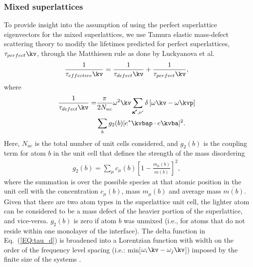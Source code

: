 \subsubsection{Mixed superlattices}
To provide insight into the assumption of using the perfect superlattice eigenvectors for the mixed superlattices, we use Tamura elastic mass-defect scattering theory \cite{tamura_isotope_1983} to modify the lifetimes predicted for perfect superlattices, $\tau_{perfect}\kv$, through the Matthiesen rule as done by Luckyanova et al. \cite{Luckyanova16112012} 
\begin{equation}\label{EQ:tau_eff}
\begin{split}
\frac{1}{\tau_{effective}\kv} = \frac{1}{\tau_{defect}\kv}+\frac{1}{\tau_{perfect}\kv} ,
\end{split}
\end{equation}
where
\begin{equation}\label{EQ:tau_d}
\begin{split}
\frac{1}{\tau_{defect}\kv} = &\frac{\pi}{2N_{uc}}\omega^2\kv \sum_{\pmb{\kappa'},\nu'} \delta\left[ \omega\kv - \omega\kvp \right]\\
&\sum_{b} g_2(b) |e^*\kvbap \cdot e\kvba |^2 .
\end{split}
\end{equation}
Here, $N_{uc}$ is the total number of unit cells considered, and $g_2(b)$ is the coupling term for atom $b$ in the unit cell that defines the strength of the mass disordering
\begin{equation}\label{EQ:g(b)}
\begin{split}
g_2(b) = \sum_\mu c_{\mu}(b)\left[1-\frac{m_{\mu}(b)}{\overline{m(b)}}\right]^2, 
\end{split}
\end{equation}
where the summation is over the possible species at that atomic position in the unit cell with the concentration $c_\mu(b)$, mass $m_\mu(b)$ and average mass $\overline{m(b)}$. Given that there are two atom types in the superlattice unit cell, the lighter atom can be considered to be a mass defect of the heavier portion of the superlattice, and vice-versa. $g_2(b)$ is zero if atom $b$ was unmixed (i.e., for atoms that do not reside within one monolayer of the interface). The delta function in Eq.~(\ref{EQ:tau_d}) is broadened into a Lorentzian function with width on the order of the frequency level spacing (i.e.: min[$\omega_i \kv -\omega_j \kv$]) imposed by the finite size of the systems \cite{allen_thermal_1993}.

